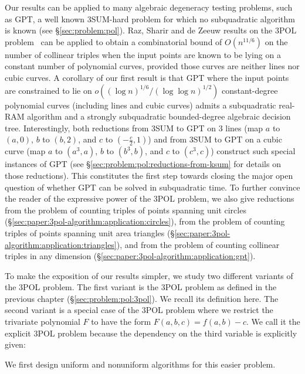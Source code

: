Our results can be applied to many algebraic degeneracy testing problems, such
as GPT, a well known 3SUM-hard problem for which no subquadratic algorithm is
known (see \S\ref{sec:problem:pol}).
%
Raz, Sharir
and de Zeeuw results on the 3POL problem~\cite{RSZ15} can be applied to obtain
a combinatorial bound of $O(n^{11/6})$ on the
number of collinear triples when the input points are known to be lying on
a constant number of polynomial curves, provided those curves are neither
lines nor cubic curves.
%
A corollary of our first result is that
GPT where the input points are constrained to lie on
$o({(\log n)}^{1/6}/{(\log \log n)}^{1/2})$
constant-degree polynomial curves (including lines and cubic curves)
admits a subquadratic real-RAM algorithm and
a strongly subquadratic bounded-degree algebraic decision tree.
Interestingly, both reductions from 3SUM to GPT on 3 lines (map $a$ to $(a,0)$,
$b$ to $(b,2)$, and $c$ to $(-\frac c2, 1)$) and from 3SUM to GPT on a
cubic curve (map $a$ to $(a^3,a)$, $b$ to $(b^3,b)$, and $c$ to $(c^3,c)$)
construct such special instances of GPT (see
\S\ref{sec:problem:pol:reductions-from-ksum} for details on those reductions).
This constitutes the first step towards closing the major open question of
whether GPT can be solved in subquadratic time.
%
To further convince the reader of the expressive power of the 3POL problem,
we also give reductions
from the problem of counting triples of points spanning
unit circles (\S\ref{sec:paper:3pol-algorithm:application:circles}),
from the problem of counting triples of points spanning unit area
triangles (\S\ref{sec:paper:3pol-algorithm:application:triangles}),
and
from the problem of counting collinear triples in any dimension
(\S\ref{sec:paper:3pol-algorithm:application:gpt}).

To make the exposition of our results simpler,
we study two different variants of the 3POL problem.
The first variant is the 3POL problem as defined in the previous chapter
(\S\ref{sec:problem:pol:3pol}).
We recall its definition here.
\ProblemPOLImplicit*
The second variant is a special case of the 3POL problem where we
restrict the trivariate polynomial $F$ to have the form $F(a,b,c) = f(a,b) -
c$. We call it the explicit 3POL problem because the dependency on the third
variable is explicitly given:

We first design uniform and nonuniform algorithms for this easier problem.




